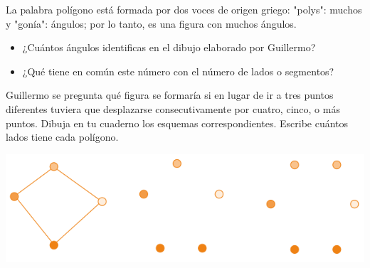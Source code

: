 \documentclass[letterpaper,11pt,twoside]{article}
\begin{document}
\begin{multicols}{2}
La palabra polígono está formada por dos voces de origen griego: "polys": muchos y "gonía": ángulos; por lo tanto,
es una figura con muchos ángulos.
\begin{itemize}
\item ¿Cuántos ángulos identificas en el dibujo elaborado por
Guillermo?
\item ¿Qué tiene en común este número con el número de
lados o segmentos?
\end{itemize}
Guillermo se pregunta qué figura se formaría si en lugar
de ir a tres puntos diferentes tuviera que desplazarse consecutivamente por cuatro, cinco, o más puntos. Dibuja en
tu cuaderno los esquemas correspondientes. Escribe cuántos
lados tiene cada polígono.
\begin{center}
\includegraphics[scale=.75]{Images/poligonos.png} 
\end{center} 

\end{multicols}
\end{document}

